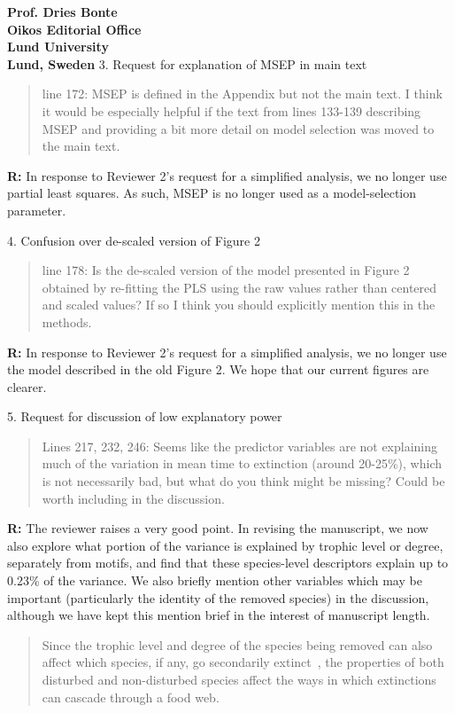 \documentclass[12pt]{letter}
\begin{document}
\begin{letter}{\bf Prof. Dries Bonte\\
Oikos Editorial Office \\
Lund University \\
Lund, Sweden}
    3. Request for explanation of MSEP in main text 
    
        \begin{quotation}
        line 172: MSEP is defined in the Appendix but not the main text. I think it would be especially helpful if the text from lines 133-139 describing MSEP and providing a bit more detail on model selection was moved to the main text.
        \end{quotation}
        
        \textbf{R:} In response to Reviewer 2's request for a simplified analysis, we no longer use partial least squares. As such, MSEP is no longer used as a model-selection parameter.


  4. Confusion over de-scaled version of Figure 2 

    \begin{quotation}
    line 178: Is the de-scaled version of the model presented in Figure 2 obtained by re-fitting the PLS using the raw values rather than centered and scaled values? If so I think you should explicitly mention this in the methods.  
    \end{quotation}


    \textbf{R:} In response to Reviewer 2's request for a simplified analysis, we no longer use the model described in the old Figure 2. We hope that our current figures are clearer.


  5. Request for discussion of low explanatory power

    \begin{quotation}
    Lines 217, 232, 246: Seems like the predictor variables are not explaining much of the variation in mean time to extinction (around 20-25\%), which is not necessarily bad, but what do you think might be missing? Could be worth including in the discussion.
    \end{quotation}

    \textbf{R:}
    The reviewer raises a very good point. In revising the manuscript, we now also explore what portion of the variance is explained by trophic level or degree, separately from motifs, and find that these species-level descriptors explain up to 0.23\% of the variance. We also briefly mention other variables which may be important (particularly the identity of the removed species) in the discussion, although we have kept this mention brief in the interest of manuscript length.
    
    \begin{quotation}
        Since the trophic level and degree of the species being removed can also affect which species, if any, go secondarily extinct~\citep{Wootton2016a,Dunne2002}, the properties of both disturbed and non-disturbed species affect the ways in which extinctions can cascade through a food web.
        

\end{quotation}
\end{letter}
\end{document}
